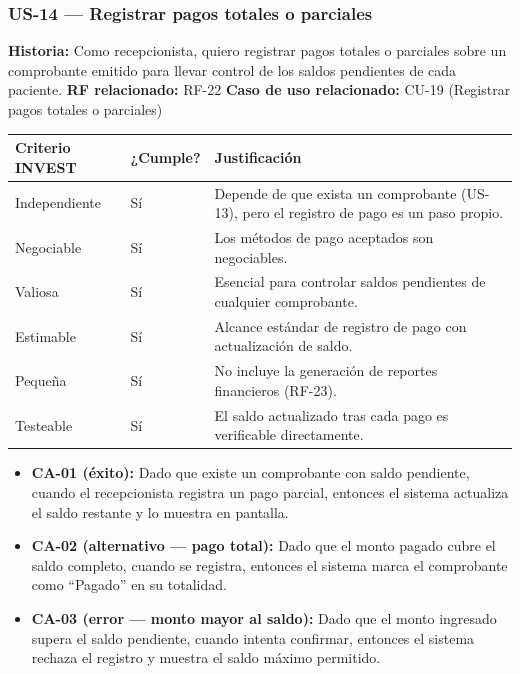 \documentclass[11pt,a4paper]{article}
\providecommand{\tightlist}{%
	\setlength{\itemsep}{0pt}\setlength{\parskip}{0pt}}
\begin{document}
	\subsubsection{US-14 --- Registrar pagos totales o parciales}
	
	\textbf{Historia:} Como recepcionista, quiero registrar pagos totales o parciales sobre un comprobante emitido para llevar control de los saldos pendientes de cada paciente.
	\textbf{RF relacionado:} RF-22
	\textbf{Caso de uso relacionado:} CU-19 (Registrar pagos totales o parciales)
	
	\begin{longtable}{p{} p{} p{}}
		
		
		\toprule
		\textbf{Criterio INVEST} &
		\textbf{¿Cumple?} &
		\textbf{Justificación} \\
		\midrule
		\endhead
		
		Independiente & Sí & Depende de que exista un comprobante (US-13), pero el registro de pago es un paso propio. \\
		Negociable & Sí & Los métodos de pago aceptados son negociables. \\
		Valiosa & Sí & Esencial para controlar saldos pendientes de cualquier comprobante. \\
		Estimable & Sí & Alcance estándar de registro de pago con actualización de saldo. \\
		Pequeña & Sí & No incluye la generación de reportes financieros (RF-23). \\
		Testeable & Sí & El saldo actualizado tras cada pago es verificable directamente. \\
		\bottomrule
	\end{longtable}
	
	\begin{itemize}
		\tightlist
		\item
		\textbf{CA-01 (éxito):} Dado que existe un comprobante con saldo pendiente, cuando el recepcionista registra un pago parcial, entonces el sistema actualiza el saldo restante y lo muestra en pantalla.
		\item
		\textbf{CA-02 (alternativo --- pago total):} Dado que el monto pagado cubre el saldo completo, cuando se registra, entonces el sistema marca el comprobante como ``Pagado'' en su totalidad.
		\item
		\textbf{CA-03 (error --- monto mayor al saldo):} Dado que el monto ingresado supera el saldo pendiente, cuando intenta confirmar, entonces el sistema rechaza el registro y muestra el saldo máximo permitido.
	\end{itemize}
	
\end{document}
